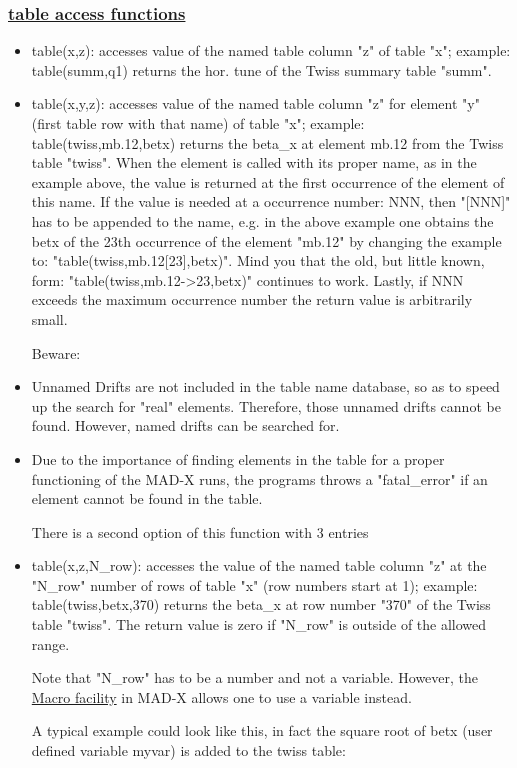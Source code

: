 \subsubsection{\href{table}{table access functions}}
\begin{itemize}
	\item table(x,z): accesses value of the named table column "z" of table "x"; example: table(summ,q1) returns the hor. tune of the Twiss summary table "summ". 
	\item table(x,y,z): accesses value of the named table column "z" for element "y" (first table row with that name) of table "x"; example: table(twiss,mb.12,betx) returns the beta\_x at element mb.12 from the Twiss table "twiss".   When the element is called with its proper name, as in the example above, the value is returned at the first occurrence of the element of this name. If the value is needed at a occurrence number: NNN, then "[NNN]" has to be appended to the name, e.g. in the above example one obtains the betx of the 23th occurrence of the element "mb.12" by changing the example to: "table(twiss,mb.12[23],betx)". Mind you that the old, but little known, form: "table(twiss,mb.12-\textgreater 23,betx)" continues to work. Lastly, if NNN exceeds the maximum occurrence number the return value is arbitrarily small. 

Beware: 
	\item  Unnamed Drifts are not included in the table name database, so as to speed up the search for "real" elements. Therefore, those  unnamed drifts cannot be found. However, named drifts can be searched for. 
	\item  Due to the importance of finding elements in the table for a proper functioning of the MAD-X runs, the programs throws a "fatal\_error" if an element cannot be found in the table.  

 There is a second option of this function with 3 entries  
	\item table(x,z,N\_row): accesses the value of the named table column  "z" at the "N\_row" number of rows of table "x" (row numbers start at  1); example: table(twiss,betx,370) returns the beta\_x at row number  "370" of the Twiss table "twiss". The return value is zero if "N\_row"  is outside of the allowed range.  

 Note that "N\_row" has to be a number and not a  variable. However, the \href{../control/special.html#macro}{Macro facility} in MAD-X  allows one to use a variable instead. 

 A typical example could look like this, in fact the square root of betx (user defined variable myvar) is added to the twiss table: 



\end{itemize}
